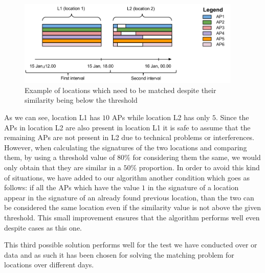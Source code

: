 \begin{figure}[!h]
\centering
\includegraphics[width=0.95\textwidth]{figures/matching/different_fp_same_loc.png}
\caption{Example of locations which need to be matched despite their similarity
being below the threshold}
\label{same_location_less_than_threshold}
\end{figure}

As we can see, location L1 has $10$ APs while location L2 has only $5$. Since
the APs in location L2 are also present in location L1 it is safe to assume that
the remaining APs are not present in L2 due to technical problems or
interferences. However, when calculating the signatures of the two locations and
comparing them, by using a threshold value of $80\%$ for considering them the
same, we would only obtain that they are similar in a $50\%$ proportion. In
order to avoid this kind of situations, we have added to our algorithm another
condition which goes as follows: if all the APs which have the value $1$ in the
signature of a location appear in the signature of an already found previous
location, than the two can be considered the same location even if the
similarity value is not above the given threshold. This small improvement
ensures that the algorithm performs well even despite cases as this one.

This third possible solution performs well for the test we have conducted over
or data and as such it has been chosen for solving the matching problem for
locations over different days.
